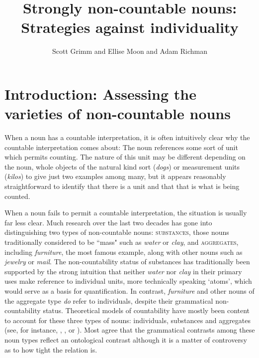 \documentclass[output=paper]{langscibook}
\author{Scott Grimm\affiliation{University of Rochester} and Ellise Moon\affiliation{University of Rochester} and Adam Richman\affiliation{University of Rochester}}
\title{Strongly non-countable nouns: Strategies against individuality}
\begin{document}
\maketitle

\section{Introduction: Assessing the varieties of non-countable nouns}
When a noun has a countable interpretation, it is often intuitively clear why the countable interpretation comes about: The noun references some sort of unit which permits counting. The nature of this unit may be different depending on the noun, whole objects of the natural kind sort (\textit{dogs}) or measurement units (\textit{kilos}) to give just two examples among many, but it appears reasonably straightforward to identify that there is a unit and that that is what is being counted.

 When a noun fails to permit a countable interpretation, the situation is usually far less clear. Much research over the last two decades has gone into distinguishing two types of non-countable nouns: \textsc{substances}, those nouns traditionally considered to be ``mass" such as \textit{water} or \textit{clay}, and \textsc{aggregates}, including \textit{furniture}, the most famous example, along with other nouns such as \textit{jewelry} or \textit{mail}. The non-countability status of substances has traditionally been supported by the strong intuition that neither \textit{water} nor \textit{clay} in their primary uses make reference to individual units, more technically speaking `atoms', which would serve as a basis for quantification. %
 In contrast, \textit{furniture} and other nouns of the aggregate type \textit{do} refer to individuals, despite their grammatical non-countability status.  Theoretical models of countability have mostly been content to account for these three types of nouns: individuals, substances and aggregates (see, for instance, \citealt{Bale2009}, \citealt{Chierchia2010}, or \citealt{Deal2016}).  Most agree that the grammatical contrasts among these noun types reflect an ontological contrast although it is a matter of controversy as to how tight the relation is.  
\end{document}
